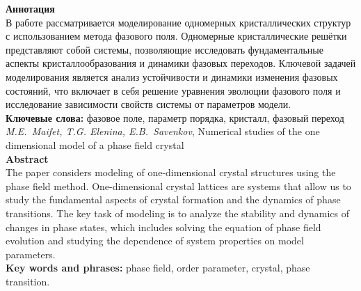 \documentclass[a4paper, 12pt]{article}
\theoremstyle{plain}
\theoremstyle{remark}
\begin{document}
\noindent\textbf{Аннотация}\\
{\small
  В работе рассматривается моделирование одномерных кристаллических структур с использованием метода фазового поля. Одномерные кристаллические решётки представляют собой системы, позволяющие исследовать фундаментальные аспекты кристаллообразования и динамики фазовых переходов.
  Ключевой задачей моделирования является анализ устойчивости и динамики изменения фазовых состояний, что включает в себя решение уравнения эволюции фазового поля и исследование зависимости свойств системы от параметров модели.\\[3mm]
%
  \noindent
  \textbf{Ключевые слова:}
  фазовое поле, параметр порядка, кристалл, фазовый переход\\[5mm]
} %
% 
\noindent\emph{M.E.~Maifet, T.G. Elenina, E.B.~Savenkov},
Numerical studies of the one dimensional model of a phase field crystal\\[3mm]
%
\noindent\textbf{Abstract}\\
%
{\small
  The paper considers modeling of one-dimensional crystal structures using the phase field method. One-dimensional crystal lattices are systems that allow us to study the fundamental aspects of crystal formation and the dynamics of phase transitions.
  The key task of modeling is to analyze the stability and dynamics of changes in phase states, which includes solving the equation of phase field evolution and studying the dependence of system properties on model parameters.\\[3mm]
%
\textbf{Key words and phrases:} 
phase field, order parameter, crystal, phase transition.\\[3mm]
%
} %
%


\newpage

\label{sec:intro}







\clearpage



\clearpage
\tableofcontents
\end{document}
